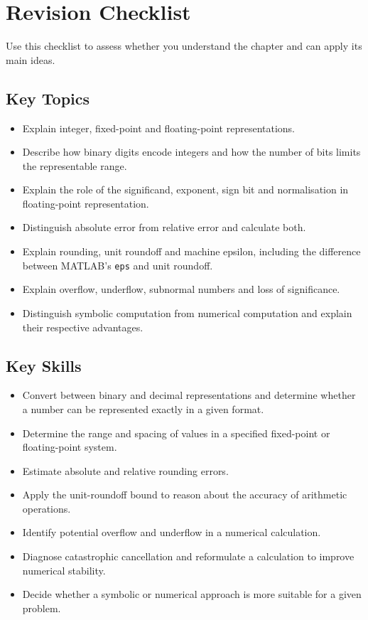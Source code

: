 \section{Revision Checklist}

Use this checklist to assess whether you understand the chapter and can apply its main ideas.

\subsection{Key Topics}

\begin{itemize}
  \item[$\square$] Explain integer, fixed-point and floating-point representations.
  \item[$\square$] Describe how binary digits encode integers and how the number of bits limits the representable range.
  \item[$\square$] Explain the role of the significand, exponent, sign bit and normalisation in floating-point representation.
  \item[$\square$] Distinguish absolute error from relative error and calculate both.
  \item[$\square$] Explain rounding, unit roundoff and machine epsilon, including the difference between MATLAB's \texttt{eps} and unit roundoff.
  \item[$\square$] Explain overflow, underflow, subnormal numbers and loss of significance.
  \item[$\square$] Distinguish symbolic computation from numerical computation and explain their respective advantages.
\end{itemize}

\subsection{Key Skills}

\begin{itemize}
  \item[$\square$] Convert between binary and decimal representations and determine whether a number can be represented exactly in a given format.
  \item[$\square$] Determine the range and spacing of values in a specified fixed-point or floating-point system.
  \item[$\square$] Estimate absolute and relative rounding errors.
  \item[$\square$] Apply the unit-roundoff bound to reason about the accuracy of arithmetic operations.
  \item[$\square$] Identify potential overflow and underflow in a numerical calculation.
  \item[$\square$] Diagnose catastrophic cancellation and reformulate a calculation to improve numerical stability.
  \item[$\square$] Decide whether a symbolic or numerical approach is more suitable for a given problem.
\end{itemize}
